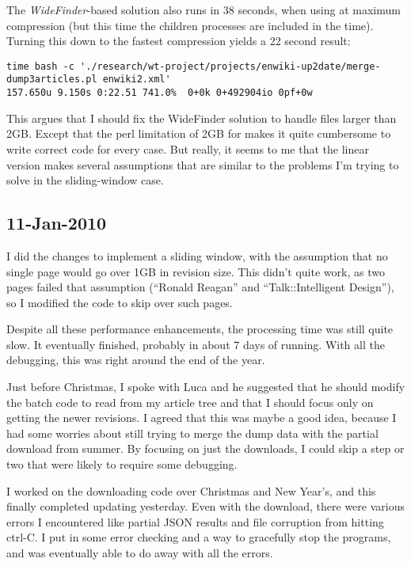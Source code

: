 The \textit{WideFinder}-based solution also runs in 38 seconds,
when using  at maximum compression (but this time
the children processes are included in the time).
Turning this down to the fastest compression yields a 22 second result:
\begin{verbatim}
time bash -c './research/wt-project/projects/enwiki-up2date/merge-dump3articles.pl enwiki2.xml'
157.650u 9.150s 0:22.51 741.0%  0+0k 0+492904io 0pf+0w
\end{verbatim}

This argues that I should fix the WideFinder solution to handle files larger than 2GB.
Except that the perl limitation of 2GB for  makes it
quite cumbersome to write correct code for every case.
But really, it seems to me that the linear version makes several assumptions
that are similar to the problems I'm trying to solve in the sliding-window case.

\subsection{11-Jan-2010}

I did the changes to implement a sliding window,
with the assumption that no single page would go over 1GB in revision size.
This didn't quite work, as two pages failed that assumption
(``Ronald Reagan'' and ``Talk::Intelligent Design''),
so I modified the code to skip over such pages.

Despite all these performance enhancements, the processing time
was still quite slow.
It eventually finished, probably in about 7 days of running.
With all the debugging, this was right around the end of the year.

Just before Christmas, I spoke with Luca and he suggested that
he should modify the batch code to read from my article tree
and that I should focus only on getting the newer revisions.
I agreed that this was maybe a good idea, because I had some worries
about still trying to merge the dump data with the partial download
from summer.
By focusing on just the downloads, I could skip a step or
two that were likely to require some debugging.

I worked on the downloading code over Christmas and New Year's,
and this finally completed updating yesterday.
Even with the download, there were various errors I encountered
like partial JSON results and file corruption from hitting ctrl-C.
I put in some error checking and a way to gracefully stop the
programs, and was eventually able to do away with all the errors.

